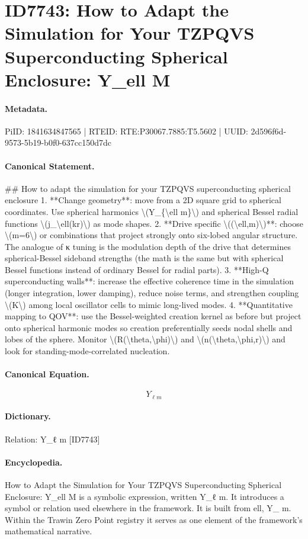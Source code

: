 \section*{ID7743: How to Adapt the Simulation for Your TZPQVS Superconducting Spherical Enclosure: Y\_ell M}
\paragraph{Metadata.}
PiID: 1841634847565 | RTEID: RTE:P30067.7885:T5.5602 | UUID: 2d596f6d-9573-5b19-b0f0-637cc150d7dc

\paragraph{Canonical Statement.}
\#\# How to adapt the simulation for your TZPQVS superconducting spherical enclosure 1. **Change geometry**: move from a 2D square grid to spherical coordinates. Use spherical harmonics \textbackslash{}(Y\_\{\textbackslash{}ell m\}\textbackslash{}) and spherical Bessel radial functions \textbackslash{}(j\_\textbackslash{}ell(kr)\textbackslash{}) as mode shapes. 2. **Drive specific \textbackslash{}((\textbackslash{}ell,m)\textbackslash{})**: choose \textbackslash{}(m=6\textbackslash{}) or combinations that project strongly onto six-lobed angular structure. The analogue of κ tuning is the modulation depth of the drive that determines spherical-Bessel sideband strengths (the math is the same but with spherical Bessel functions instead of ordinary Bessel for radial parts). 3. **High-Q superconducting walls**: increase the effective coherence time in the simulation (longer integration, lower damping), reduce noise terms, and strengthen coupling \textbackslash{}(K\textbackslash{}) among local oscillator cells to mimic long-lived modes. 4. **Quantitative mapping to QOV**: use the Bessel-weighted creation kernel as before but project onto spherical harmonic modes so creation preferentially seeds nodal shells and lobes of the sphere. Monitor \textbackslash{}(R(\textbackslash{}theta,\textbackslash{}phi)\textbackslash{}) and \textbackslash{}(n(\textbackslash{}theta,\textbackslash{}phi,r)\textbackslash{}) and look for standing-mode-correlated nucleation.

\paragraph{Canonical Equation.}
\[
Y_{\ell m}
\]

\paragraph{Dictionary.}
Relation: Y\_ℓ m [ID7743]

\paragraph{Encyclopedia.}
How to Adapt the Simulation for Your TZPQVS Superconducting Spherical Enclosure: Y\_ell M is a symbolic expression, written Y\_ℓ m. It introduces a symbol or relation used elsewhere in the framework. It is built from ell, Y\_ m. Within the Trawin Zero Point registry it serves as one element of the framework's mathematical narrative.
